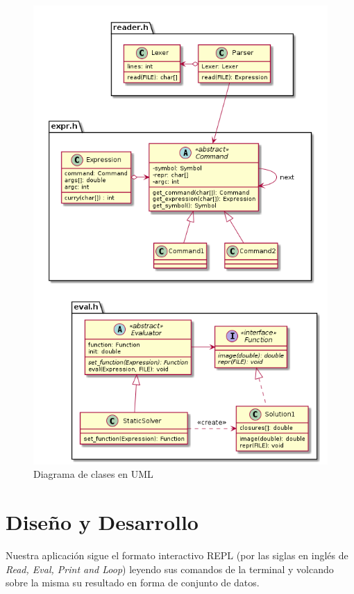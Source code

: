 \documentclass[a4paper]{article}
\begin{document}
\begin{figure}[tbp]\centering
    \includegraphics[height=.96\textheight]{laplace.png}
    \caption{Diagrama de clases en UML}
    \label{fig:class}
\end{figure}

\section{Diseño y Desarrollo}

Nuestra aplicación sigue el formato interactivo REPL (por las
siglas en inglés de \textit{Read, Eval, Print and Loop}) 
leyendo sus comandos de la terminal y volcando sobre la misma
su resultado en forma de conjunto de datos. 
\end{document}
